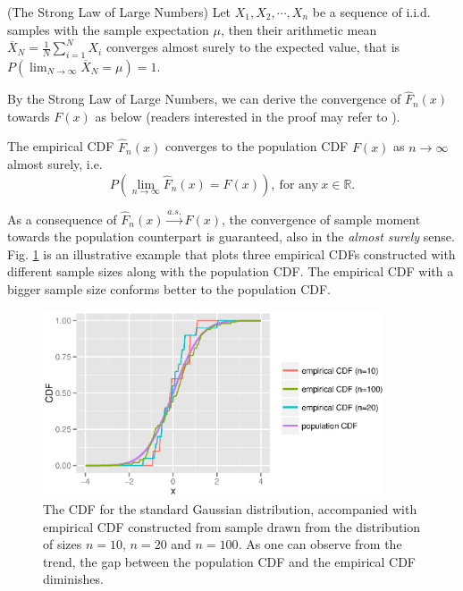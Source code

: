 \begin{thm}
(The Strong Law of Large Numbers) Let $ X_1, X_2, \cdots, X_n $ be a sequence of i.i.d. samples with the sample expectation $ \mu $, then their arithmetic mean $ \overline{X}_N = \frac{1}{N} \sum_{i=1}^N X_i$ converges almost surely to the expected value, that is $ P(\lim_{N \rightarrow \infty} \overline{X}_N = \mu) =1$.  
\end{thm}

By the Strong Law of Large Numbers, we can derive the convergence of $ \hat{F}_n(x) $ towards $ F(x) $ as below (readers interested in the proof may refer to \cite{van2000asymptotic}).
\begin{thm}
The empirical CDF $ \hat{F}_n(x) $ converges to the population CDF $ F(x) $ as $ n \rightarrow \infty$ almost surely, i.e. 
\begin{equation}
P(\lim_{n \rightarrow \infty} \hat{F}_n(x) = F(x)), \  \text{for any} \ x \in \mathbb{R}.
\end{equation}
\end{thm}

As a consequence of $ \hat{F}_n(x) \xrightarrow{a.s.} F(x) $, the convergence of sample moment towards the population counterpart is guaranteed, also in the \textit{almost surely} sense. Fig. \ref{fig:ch2_ecdf_converge} is an illustrative example that plots three empirical CDFs constructed with different sample sizes along with the population CDF. The empirical CDF with a bigger sample size conforms better to the population CDF. 

\begin{figure}[!h]
\begin{center}
\includegraphics[width=0.9\textwidth]{figures/ch2_ecdf_converge.eps}
\caption{The CDF for the standard Gaussian distribution, accompanied with empirical CDF constructed from sample drawn from the distribution of sizes $ n=10$, $n=20$ and $n=100$. As one can observe from the trend, the gap between the population CDF and the empirical CDF diminishes.}
\label{fig:ch2_ecdf_converge}
\end{center}
\end{figure}

